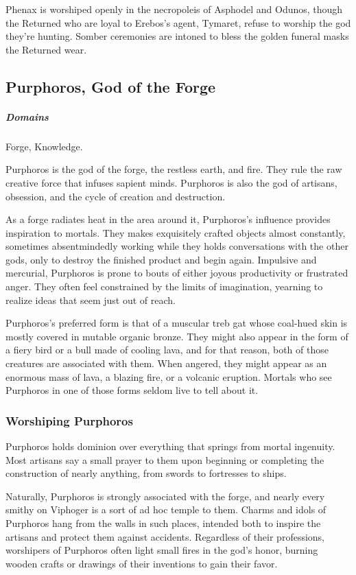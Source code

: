        Phenax is worshiped openly in the necropoleis of Asphodel and Odunos, though the Returned who are loyal to Erebos's agent, Tymaret, refuse to worship the god they're hunting.
        Somber ceremonies are intoned to bless the golden funeral masks the Returned wear.

\subsection*{Purphoros, God of the Forge} \label{ssec::purphoros}
    \subparagraph{Domains} Forge, Knowledge.

    Purphoros is the god of the forge, the restless earth, and fire.
    They rule the raw creative force that infuses sapient minds.
    Purphoros is also the god of artisans, obsession, and the cycle of creation and destruction.

    As a forge radiates heat in the area around it, Purphoros's influence provides inspiration to mortals.
    They makes exquisitely crafted objects almost constantly, sometimes absentmindedly working while they holds conversations with the other gods, only to destroy the finished product and begin again.
    Impulsive and mercurial, Purphoros is prone to bouts of either joyous productivity or frustrated anger.
    They often feel constrained by the limits of imagination, yearning to realize ideas that seem just out of reach.

    Purphoros's preferred form is that of a muscular treb gat whose coal-hued skin is mostly covered in mutable organic bronze.
    They might also appear in the form of a fiery bird or a bull made of cooling lava, and for that reason, both of those creatures are associated with them.
    When angered, they might appear as an enormous mass of lava, a blazing fire, or a volcanic eruption.
    Mortals who see Purphoros in one of those forms seldom live to tell about it.

    \subsubsection{Worshiping Purphoros}
        Purphoros holds dominion over everything that springs from mortal ingenuity.
        Most artisans say a small prayer to them upon beginning or completing the construction of nearly anything, from swords to fortresses to ships.

        Naturally, Purphoros is strongly associated with the forge, and nearly every smithy on Viphoger is a sort of ad hoc temple to them.
        Charms and idols of Purphoros hang from the walls in such places, intended both to inspire the artisans and protect them against accidents.
        Regardless of their professions, worshipers of Purphoros often light small fires in the god's honor, burning wooden crafts or drawings of their inventions to gain their favor.

